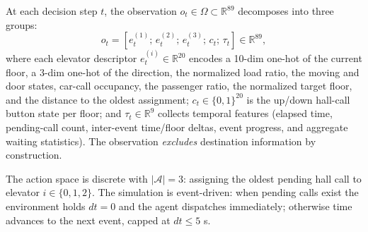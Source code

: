 \documentclass{ieeeaccess}
\begin{document}
At each decision step $t$, the observation $o_t \in \Omega \subset
\mathbb{R}^{89}$ decomposes into three groups:
\begin{equation}
o_t = \left[ e_t^{(1)};\, e_t^{(2)};\, e_t^{(3)};\, c_t;\, \tau_t
\right] \in \mathbb{R}^{89},
\end{equation}
where each elevator descriptor $e_t^{(i)} \in \mathbb{R}^{20}$
encodes a 10-dim one-hot of the current floor, a 3-dim one-hot of the
direction, the normalized load ratio, the moving and door states,
car-call occupancy, the passenger ratio, the normalized target floor,
and the distance to the oldest assignment; $c_t \in \{0,1\}^{20}$ is
the up/down hall-call button state per floor; and
$\tau_t \in \mathbb{R}^{9}$ collects temporal features (elapsed time,
pending-call count, inter-event time/floor deltas, event progress,
and aggregate waiting statistics). The observation \emph{excludes}
destination information by construction.

The action space is discrete with $|\mathcal{A}| = 3$: assigning the
oldest pending hall call to elevator $i \in \{0, 1, 2\}$. The
simulation is event-driven: when pending calls exist the environment
holds $dt = 0$ and the agent dispatches immediately; otherwise time
advances to the next event, capped at $dt \le 5$ s.
\end{document}
